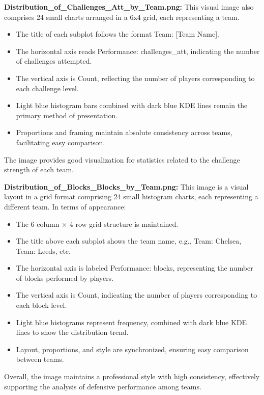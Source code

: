 \documentclass[12pt]{report}
\begin{document}
{{\textbf{Distribution\_of\_Challenges\_Att\_by\_Team.png:} %
This visual image also comprises 24 small charts arranged in a 6x4 grid, each representing a team.
\begin{itemize}
	\item The title of each subplot follows the format Team: [Team Name].
	\item The horizontal axis reads Performance: challenges\_att, indicating the number of challenges attempted.
	\item The vertical axis is Count, reflecting the number of players corresponding to each challenge level.
	\item Light blue histogram bars combined with dark blue KDE lines remain the primary method of presentation.
	\item Proportions and framing maintain absolute consistency across teams, facilitating easy comparison.
\end{itemize}
The image provides good visualization for statistics related to the challenge strength of each team.

\textbf{Distribution\_of\_Blocks\_Blocks\_by\_Team.png:} %
This image is a visual layout in a grid format comprising 24 small histogram charts, each representing a different team. In terms of appearance:
\begin{itemize}
	\item The 6 column × 4 row grid structure is maintained.
	\item The title above each subplot shows the team name, e.g., Team: Chelsea, Team: Leeds, etc.
	\item The horizontal axis is labeled Performance: blocks, representing the number of blocks performed by players.
	\item The vertical axis is Count, indicating the number of players corresponding to each block level.
	\item Light blue histograms represent frequency, combined with dark blue KDE lines to show the distribution trend.
	\item Layout, proportions, and style are synchronized, ensuring easy comparison between teams.
\end{itemize}
Overall, the image maintains a professional style with high consistency, effectively supporting the analysis of defensive performance among teams.

}}
\end{document}
